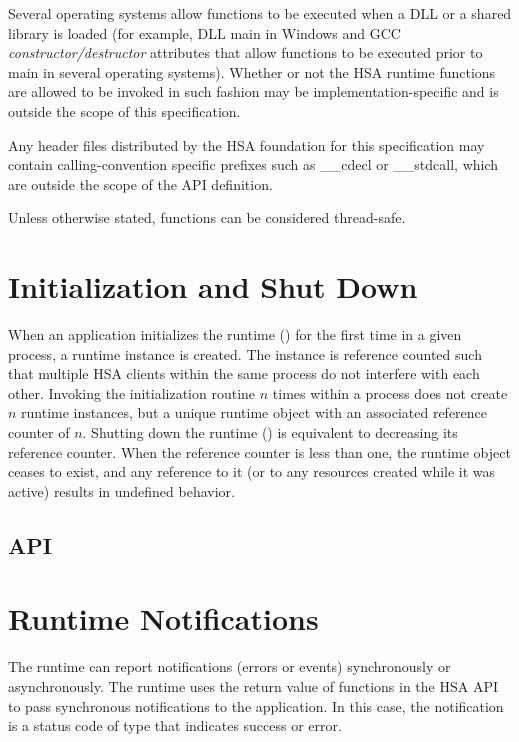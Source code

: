 \documentclass[final,oneside]{book}
\begin{document}
Several operating systems allow functions to be executed when a DLL or a shared
library is loaded (for example, DLL main in Windows and GCC
\emph{constructor/destructor} attributes that allow functions to be executed
prior to main in several operating systems). Whether or not the HSA runtime
functions are allowed to be invoked in such fashion may be
implementation-specific and is outside the scope of this specification.

Any header files distributed by the HSA foundation for this specification may
contain calling-convention specific prefixes such as __cdecl or __stdcall, which
are outside the scope of the API definition.

Unless otherwise stated, functions can be considered thread-safe.

\section{Initialization and Shut Down}\label{sec:init}
When an application initializes the runtime () for the first
time in a given process, a runtime instance is created. The instance is
reference counted such that multiple HSA clients within the same
process do not interfere with each other. Invoking the initialization routine
$n$ times within a process does not create $n$ runtime instances, but a unique
runtime object with an associated reference counter of $n$. Shutting down the
runtime () is equivalent to decreasing its reference
counter. When the reference counter is less than one, the runtime object ceases
to exist, and any reference to it (or to any resources created while it was
active) results in undefined behavior.

\subsection{API}


\section{Runtime Notifications}
\label{sec:error}

The runtime can report notifications (errors or events) synchronously or
asynchronously. The runtime uses the return value of functions in the HSA API to
pass synchronous notifications to the application. In this case, the
notification is a status code of type  that indicates
success or error.
\end{document}
